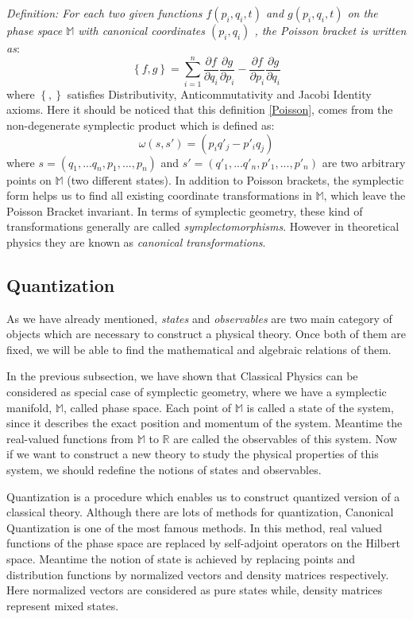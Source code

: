 \documentclass[12pt]{article}
\begin{document}
\emph{Definition: For each two given functions $f(p_i, q_i, t)$ and $g(p_i, q_i, t)$ on the phase space $\mathbb{M}$ with canonical coordinates $(p_i, q_i)$
, the Poisson bracket is written as}:
\begin{equation}\label{Poisson}
\left\{f, g\right\}= \sum_{i=1}^n\frac{\partial f}{\partial q_i}\frac{\partial g}{\partial p_i}-\frac{\partial f}{\partial p_i}\frac{\partial g}{\partial q_i}
\end{equation}
where $\left\{ ,\right\}$ satisfies Distributivity, Anticommutativity and Jacobi Identity axioms.
Here it should be noticed that this definition \ref{Poisson}, comes from the non-degenerate symplectic product which is defined as:
\begin{equation}\label{Poisson 2}
 \omega (s,s')= (p_i q'_j - p'_i q_j)
\end{equation}
 where $s=(q_1,...q_n, p_1,...,p_n)$ and $s'=(q'_1,...q'_n, p'_1,...,p'_n)$ are two arbitrary points on $\mathbb{M}$ (two different states). In addition to Poisson brackets, the symplectic form helps us to find all existing coordinate transformations in $\mathbb{M}$, which leave the Poisson Bracket invariant. In terms of symplectic geometry, these kind of transformations generally are called \emph{symplectomorphisms}. However in theoretical physics they are known as \emph{canonical transformations}.
\subsection{Quantization}\label{Quant}
As we have already mentioned, \emph{states} and \emph{observables} are two main category of objects which are necessary to construct a physical theory. Once both of them are fixed, we will be able to find the mathematical and algebraic relations of them.

In the previous subsection, we have shown that Classical Physics can be considered as special case of symplectic geometry, where we have a symplectic manifold, $\mathbb{M}$, called phase space. Each point of $\mathbb{M}$ is called a state of the system, since it describes the exact position and momentum of the system. Meantime the real-valued functions from $\mathbb{M}$ to $\mathbb{R}$ are called the observables of this system. Now if we want to construct a new theory to study the physical properties of this system, we should redefine the notions of states and observables.

Quantization is a procedure which enables us to construct quantized version of a classical theory. Although there are lots of methods for quantization, Canonical Quantization is one of the most famous methods. In this method, real valued functions of the phase space are replaced by self-adjoint operators on the Hilbert space. Meantime the notion of state is achieved by replacing points and distribution functions by normalized vectors and density matrices respectively. Here normalized vectors are considered as pure states while, density matrices represent mixed states.
\end{document}
